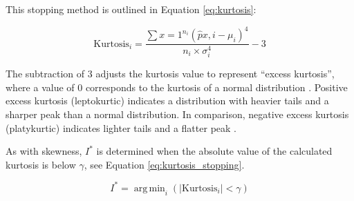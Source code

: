 \documentclass[sigconf,natbib=true,anonymous=true]{acmart}
\DeclareMathOperator*{\argmin}{arg\,min}
\begin{document}
This stopping method is outlined in Equation \ref{eq:kurtosis}:

\begin{equation}
\label{eq:kurtosis}
\text{Kurtosis}_i = \frac{\sum{x=1}^{n_i} (\hat{p}{x,i} - \mu_i)^4}{n_i \times \sigma_i^4} - 3
\end{equation}

The subtraction of 3 adjusts the kurtosis value to represent ``excess kurtosis'', where a value of 0 corresponds to the kurtosis of a normal distribution \cite{decarlo_meaning_1997}. Positive excess kurtosis (leptokurtic) indicates a distribution with heavier tails and a sharper peak than a normal distribution. In comparison, negative excess kurtosis (platykurtic) indicates lighter tails and a flatter peak \cite{Balanda01051988}.

As with skewness, $I^*$ is determined when the absolute value of the calculated kurtosis is below $\gamma$, see Equation \ref{eq:kurtosis_stopping}.

\begin{equation}
\label{eq:kurtosis_stopping}
I^* = \argmin_{i} \left( |\text{Kurtosis}_i| < \gamma  \right)
\end{equation}


\end{document}
